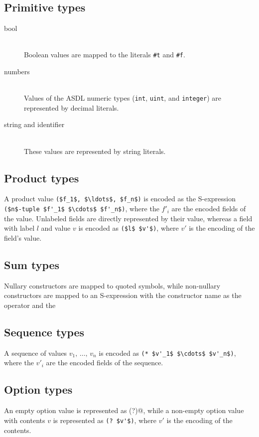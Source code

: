 \subsection{Primitive types}

\begin{description}
  \item[bool] \mbox{}\\
    Boolean values are mapped to the literals \lstinline!#t! and \lstinline!#f!.
    
  \item[numbers] \mbox{}\\
    Values of the ASDL numeric types (\lstinline!int!, \lstinline!uint!, and
    \lstinline!integer!) are represented by decimal literals.

  \item[string and identifier] \mbox{}\\
    These values are represented by string literals.
\end{description}%

\subsection{Product types}
A product value \lstinline[mathescape=true]@($f_1$, $\ldots$, $f_n$)@
is encoded as the
S-expression \lstinline[mathescape=true]@($n$-tuple $f'_1$ $\cdots$ $f'_n$)@,
where the $f'_i$ are the encoded fields of the value.
Unlabeled fields are directly represented by their value, whereas a
field with label $l$ and value $v$ is encoded as
\lstinline[mathescape=true]@($l$ $v'$)@, where $v'$ is the encoding of the field's
value.

\subsection{Sum types}
Nullary constructors are mapped to quoted symbols, while non-nullary constructors are mapped
to an S-expression with the constructor name as the operator and the 

\subsection{Sequence types}
A sequence of values $v_1,\,\ldots,\,v_n$ is encoded as
\lstinline[mathescape=true]@(* $v'_1$ $\cdots$ $v'_n$)@,
where the $v'_i$ are the encoded fields of the sequence.

\subsection{Option types}
An empty option value is represented as \lstinline@(?)@, while a non-empty
option value with contents $v$ is represented as \lstinline[mathescape=true]@(? $v'$)@,
where $v'$ is the encoding of the contents.

